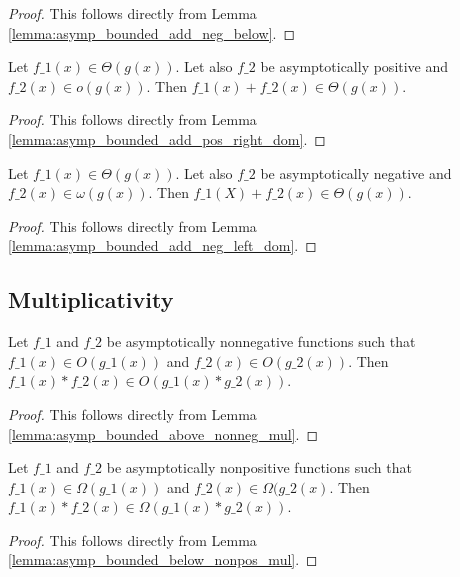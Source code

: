 \begin{proof}
    \leanok
    This follows directly from Lemma \ref{lemma:asymp_bounded_add_neg_below}.
\end{proof}

\begin{lemma}
    \label{lemma:theta_add_pos_o}
    \leanok
    Let $f\_1(x) \in \Theta(g(x))$. Let also $f\_2$ be asymptotically positive and
    $f\_2(x) \in o(g(x))$. Then $f\_1(x) + f\_2(x) \in \Theta(g(x))$.
\end{lemma}

\begin{proof}
    \leanok
    This follows directly from Lemma \ref{lemma:asymp_bounded_add_pos_right_dom}.
\end{proof}

\begin{theorem}
    \label{thm:theta_add_neg_omega}
    \leanok
    Let $f\_1(x) \in \Theta(g(x))$. Let also $f\_2$ be asymptotically negative and
    $f\_2(x) \in \omega(g(x))$. Then $f\_1(X) + f\_2(x) \in \Theta(g(x))$.
\end{theorem}

\begin{proof}
    \leanok
    This follows directly from Lemma \ref{lemma:asymp_bounded_add_neg_left_dom}.
\end{proof}


\subsection{Multiplicativity}

\begin{lemma}
    \label{lemma:O_nonneg_mul}
    \leanok
    Let $f\_1$ and $f\_2$ be asymptotically nonnegative functions such that 
    $f\_1(x) \in O(g\_1(x))$ and $f\_2(x) \in O(g\_2(x))$. Then 
    $f\_1(x) * f\_2(x) \in O(g\_1(x) * g\_2(x))$.
\end{lemma}

\begin{proof}
    \leanok
    This follows directly from Lemma \ref{lemma:asymp_bounded_above_nonneg_mul}.
\end{proof}

\begin{lemma}
    \label{lemma:Omega_nonpos_mul}
    \leanok
    Let $f\_1$ and $f\_2$ be asymptotically nonpositive functions such that 
    $f\_1(x) \in \Omega(g\_1(x))$ and $f\_2(x) \in \Omega(g\_2(x)$. 
    Then $f\_1(x) * f\_2(x) \in \Omega(g\_1(x) * g\_2(x))$.
\end{lemma}

\begin{proof}
    \leanok
    This follows directly from Lemma \ref{lemma:asymp_bounded_below_nonpos_mul}.
\end{proof}
